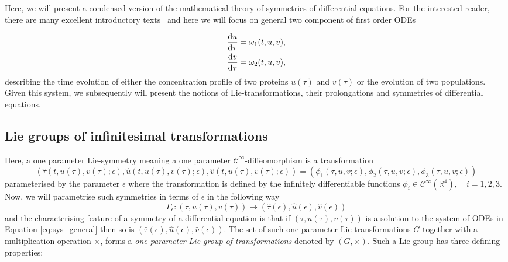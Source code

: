 Here, we will present a condensed version of the mathematical theory of symmetries of differential equations. For the interested reader, there are many excellent introductory texts~\cite{bluman1989symmetries,hydon2000symmetry,olver2000applications,olver2008equivalence,lang2001,nakahara2003} and here we will focus on general two component of first order ODEs

\begin{equation}
  \begin{split}
    \dv{u}{\tau}&=\omega_1(t,u,v),\\
    \dv{v}{\tau}&=\omega_2(t,u,v),\\    
    \end{split}
  \label{eq:sys_general}
\end{equation}
describing the time evolution of either the concentration profile of two proteins $u(\tau)$ and $v(\tau)$ or the evolution of two populations. Given this system, we subsequently will present the notions of Lie-transformations, their prolongations and symmetries of differential equations. 


\subsection{Lie groups of infinitesimal transformations}
Here, a one parameter Lie-symmetry meaning a one parameter $\mathcal{C}^{\infty}$-diffeomorphism is a transformation
\begin{equation}
  (\hat{\tau}(t,u(\tau),v(\tau);\epsilon),\hat{u}(t,u(\tau),v(\tau);\epsilon),\hat{v}(t,u(\tau),v(\tau);\epsilon))=\left(\phi_1(\tau,u,v;\epsilon),\phi_2(\tau,u,v;\epsilon),\phi_3(\tau,u,v;\epsilon)\right)
  \label{eq:symmetry_original}
  \end{equation}
parameterised by the parameter $\epsilon$ where the transformation is defined by the infinitely differentiable functions $\phi_i\in\mathcal{C}^{\infty}(\mathbb{R}^4),\quad i=1,2,3$. Now, we will parametrise such symmetries in terms of $\epsilon$ in the following way
\begin{equation}
\Gamma_{\epsilon}:(\tau,u(\tau),v(\tau))\mapsto\left(\hat{\tau}(\epsilon),\hat{u}(\epsilon),\hat{v}(\epsilon)\right)
\label{eq:symmetry_general}
\end{equation}
and the characterising feature of a symmetry of a differential equation is that if $(\tau,u(\tau),v(\tau))$ is a solution to the system of ODEs in Equation \eqref{eq:sys_general} then so is $(\hat{\tau}(\epsilon),\hat{u}(\epsilon),\hat{v}(\epsilon))$. The set of such one parameter Lie-transformations $G$ together with a multiplication operation $\times$, forms a \textit{one parameter Lie group of transformations} denoted by $(G,\times)$. Such a Lie-group has three defining properties:

